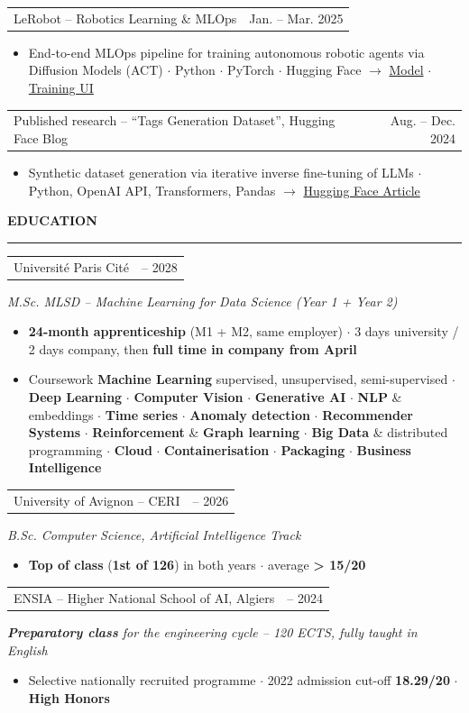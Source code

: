 \documentclass[10pt, a4paper]{article}
\makeatletter
\newcommand{\headfont}{\sffamily}
\newlength{\mainInner}\setlength{\mainInner}{\textwidth}
\providecommand{\cvFit}{1.0}
\newlength{\cvgap}
\newcommand{\vgap}[1]{\setlength{\cvgap}{#1}\vspace{\cvFit\cvgap}}
\newcommand{\mainSection}[1]{%
  \vgap{6pt}%
  {\headfont\color{sectionColor}\fontsize{10pt}{11.5pt}\selectfont\bfseries\MakeUppercase{#1}}\par%
  \nointerlineskip\vgap{2pt}%
  {\color{ruleColor}\rule{\mainInner}{0.8pt}}\par\vgap{4pt}%
}
\newcommand{\cvEntry}[4]{%
  \begin{tabularx}{\mainInner}{@{}X r@{}}
    {\headfont\fontsize{10pt}{11.5pt}\selectfont #1} &
    {\headfont\color{mutedText}\fontsize{8.5pt}{10pt}\selectfont #3}
  \end{tabularx}\par\vspace{1pt}%
  {\color{subtitleColor}\fontsize{9.5pt}{10pt}\selectfont\itshape #2}\par
  #4\vgap{6pt}%
}
\newcommand{\cvProject}[3]{%
  \begin{tabularx}{\mainInner}{@{}X r@{}}
    {\headfont\fontsize{10pt}{11.5pt}\selectfont #1} &
    {\headfont\color{mutedText}\fontsize{8.5pt}{10pt}\selectfont #2}
  \end{tabularx}\par\vspace{1pt}%
  #3\vgap{5pt}%
}
\newcommand{\cvBullets}[1]{%
  \vspace{2pt}%
  \begin{itemize}[leftmargin=10pt,itemsep=1pt,topsep=0pt,partopsep=0pt,parsep=0pt,
    label={\color{gold}\small$\bullet$}]
    #1
  \end{itemize}%
}
\newcommand{\cvItem}[1]{\item{\fontsize{8.8pt}{10.8pt}\selectfont #1}}
\makeatother
\begin{document}
\begin{lrbox}{\cvMainBox}
\begin{minipage}[t]{\mainInner}
  \cvProject{LeRobot -- Robotics Learning \& MLOps}
    {Jan. -- Mar. 2025}{%
    \cvBullets{
      \cvItem{End-to-end MLOps pipeline for training autonomous robotic agents via Diffusion Models (ACT) $\cdot$ Python $\cdot$ PyTorch $\cdot$ Hugging Face $\to$ \href{https://huggingface.co/zino36/lerobot-pusht-colab}{Model} $\cdot$ \href{https://huggingface.co/spaces/zino36/lerobot-pusht-trainer}{Training UI}}
    }
  }


  \cvProject{Published research -- ``Tags Generation Dataset'', Hugging Face Blog}
    {Aug. -- Dec. 2024}{%
    \cvBullets{
      \cvItem{Synthetic dataset generation via iterative inverse fine-tuning of LLMs $\cdot$ Python, OpenAI API, Transformers, Pandas $\to$ \href{https://huggingface.co/blog/zino36/tags-generation-dataset-article}{Hugging Face Article}}
    }
  }

  \mainSection{Education}
  \cvEntry{Université Paris Cité}
    {M.Sc. MLSD -- Machine Learning for Data Science (Year 1 + Year 2)}
    {2026 -- 2028}{%
    \cvBullets{
      \cvItem{\textbf{24-month apprenticeship} (M1 + M2, same employer) $\cdot$ 3 days university / 2 days company, then \textbf{full time in company from April}}
      \cvItem{Coursework \textbf{Machine Learning} supervised, unsupervised, semi-supervised $\cdot$ \textbf{Deep Learning} $\cdot$ \textbf{Computer Vision} $\cdot$ \textbf{Generative AI} $\cdot$ \textbf{NLP} \& embeddings $\cdot$ \textbf{Time series} $\cdot$ \textbf{Anomaly detection} $\cdot$ \textbf{Recommender Systems} $\cdot$ \textbf{Reinforcement} \& \textbf{Graph learning} $\cdot$ \textbf{Big Data} \& distributed programming $\cdot$ \textbf{Cloud} $\cdot$ \textbf{Containerisation} $\cdot$ \textbf{Packaging} $\cdot$ \textbf{Business Intelligence}}
    }
  }

  \cvEntry{University of Avignon -- CERI}
    {B.Sc. Computer Science, Artificial Intelligence Track}
    {2024 -- 2026}{%
    \cvBullets{
      \cvItem{\textbf{Top of class} (\textbf{1st of 126}) in both years $\cdot$ average \textbf{> 15/20}}
    }
  }

  \cvEntry{ENSIA -- Higher National School of AI, Algiers}
    {\textbf{Preparatory class} for the engineering cycle -- 120 ECTS, fully taught in English}
    {2022 -- 2024}{%
    \cvBullets{
      \cvItem{Selective nationally recruited programme $\cdot$ 2022 admission cut-off \textbf{18.29/20} $\cdot$ \textbf{High Honors}}
    }
  }


\end{minipage}
\end{lrbox}
\end{document}
